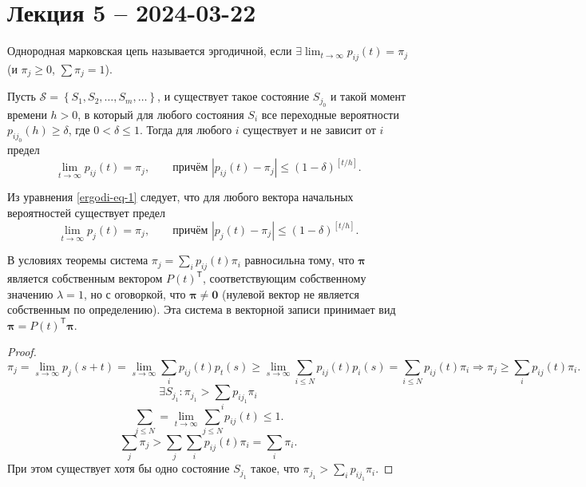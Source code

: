 \section{Лекция 5 -- 2024-03-22}
\begin{definition}
  Однородная марковская цепь называется эргодичной, если $\exists \lim_{t\to\infty} p_{ij}(t) = \pi_j$
  (и $\pi_j \geqslant 0$, $\sum \pi_j = 1$).
\end{definition}

\begin{theorem}
  Пусть $\mathscr{S} = \left\{ S_1, S_2, \dots, S_m, \dots \right\}$, и существует
  такое состояние
  $S_{j_0}$ и такой момент времени $h>0$, в который для любого состояния $ S_i $
  все переходные вероятности $p_{i j_0}(h) \geqslant
  \delta$, где $ 0 < \delta \leqslant 1 $. Тогда для любого $ i $ существует и
  не зависит от $ i $ предел
    \begin{equation}\label{ergodi-eq-1}\tag{\ast}
      \lim_{t\to\infty} p_{ij}(t) = \pi_j, \qquad \text{причём }
      |p_{ij}(t) - \pi_j| \leqslant (1-\delta)^{\left[t/h\right]}.
    \end{equation}
\end{theorem}

\setcounter{corollary}{0}
\begin{corollary} 
    Из уравнения \eqref{ergodi-eq-1} следует, что для любого вектора
      начальных вероятностей существует предел
      \[
        \lim_{t\to\infty} p_j(t) = \pi_j, \qquad \text{причём }
        |p_j(t) - \pi_j| \leqslant (1-\delta)^{\left[ t/h \right]}.
      \]
    \end{corollary}

    \begin{corollary}
    В условиях теоремы система $\pi_j = \sum\limits_{i} p_{ij}(t) \pi_i$
    равносильна тому, что $\bm\pi$ является
    собственным вектором $P(t)^{\mathsf T}$, соответствующим собственному значению $\lambda = 1$, но с оговоркой,
    что $\bm\pi \neq \mathbf{0}$ (нулевой вектор не является собственным по определению).
    Эта система в векторной записи принимает вид $\bm\pi = P(t)^{\mathsf T}
    \bm\pi$.
      \begin{proof}
        \[
          \pi_j = \lim_{s\to\infty} p_j(s+t) = \lim_{s\to\infty} \sum_i p_{ij}(t) p_t(s)
          \geqslant \lim_{s\to\infty} \sum_{i \leqslant N} p_{ij}(t) p_i(s)
          = \sum_{i \leqslant N} p_{ij}(t) \pi_i \Rightarrow \pi_j \geqslant \sum_i p_{ij}(t) \pi_i.
        \]
        \[
          \exists S_{j_1} : \pi_{j_1} > \sum_i p_{ij_1} \pi_i
        \]
        \[
          \sum_{j\leqslant N} = \lim_{t\to\infty} \sum_{j\leqslant N} p_{ij}(t) \leqslant 1.
        \]
        \[
          \sum_j \pi_j > \sum_j \sum_i p_{ij}(t) \pi_i = \sum_i \pi_i.
        \]
              При этом существует хотя бы одно состояние $ S_{j_1} $ такое, что $
      \pi_{j_1} > \sum\limits_ip_{ij_1}\pi_i $. 
      \end{proof}
    \end{corollary}

